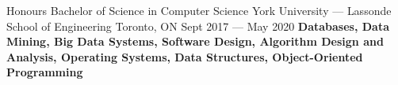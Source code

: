 

\begin{cventries}

  
  \cventryedu
    {Honours Bachelor of Science in Computer Science} %
    {York University — Lassonde School of Engineering} %
    {Toronto, ON} %
    {Sept 2017 — May 2020} %
    {\textbf{Databases, Data Mining, Big Data Systems, Software Design, Algorithm Design and Analysis, Operating Systems, Data Structures, Object-Oriented Programming}}
    
  

\end{cventries}
